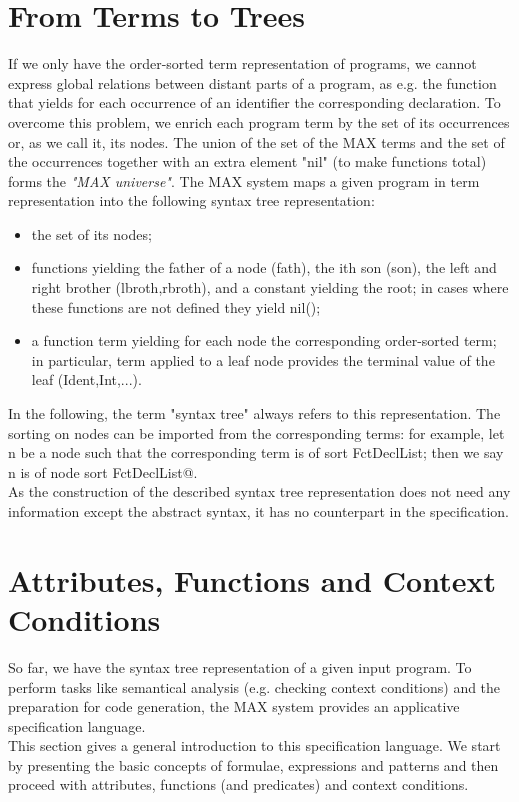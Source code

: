 \section{From Terms to Trees}
\medskip
If we only have the order-sorted term representation of programs, we cannot express global relations between distant parts of a program, as e.g. the function that yields for each occurrence of an identifier the corresponding declaration. To overcome this problem, we enrich each program term by the set of its occurrences or, as we call it, its nodes. The union of the set of the MAX terms and the set of the occurrences together with an extra element "nil" (to make functions total) forms the {\em "MAX universe"}. The MAX system maps a given program in term representation into the following syntax tree representation:
\begin{itemize}
\item the set of its nodes;
\item functions yielding the father of a node (fath), the ith son (son), the left and right brother (lbroth,rbroth), and a constant yielding the root; in cases where these functions are not defined they yield nil();
\item a function term yielding for each node the corresponding order-sorted term; in particular, term applied to a leaf node provides the terminal value of the leaf (Ident,Int,...).
\end{itemize}
In the following, the term "syntax tree" always refers to this representation. The sorting on nodes can be imported from the corresponding terms: for example, let n be a node such that the corresponding term is of sort FctDeclList; then we say n is of node sort FctDeclList@.\\
As the construction of the described syntax tree representation does not need any information except the abstract syntax, it has no counterpart in the specification.
\\


\section{Attributes, Functions and Context Conditions}

So far, we have the syntax tree representation of a given input program. To perform tasks like semantical analysis (e.g. checking context conditions) and the preparation for code generation, the MAX system provides an applicative specification language. \\  
This section gives a general introduction to this specification language. We start by presenting the basic concepts of formulae, expressions and patterns and then proceed with attributes, functions (and predicates) and context conditions.
